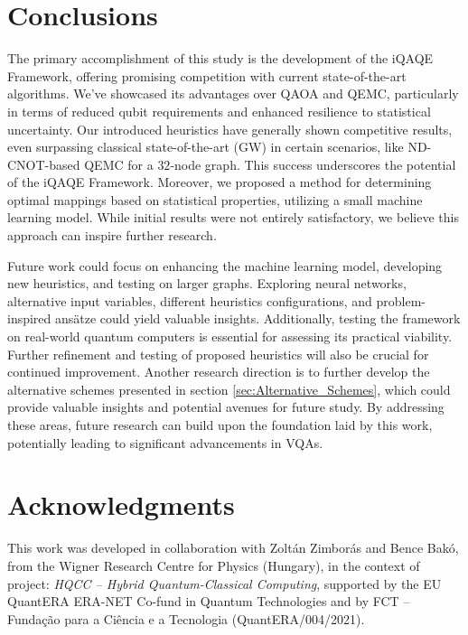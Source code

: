 \section{Conclusions}
\label{sec:Conclusions}
The primary accomplishment of this study is the development of the iQAQE Framework, offering promising competition with current state-of-the-art algorithms. We've showcased its advantages over QAOA and QEMC, particularly in terms of reduced qubit requirements and enhanced resilience to statistical uncertainty. Our introduced heuristics have generally shown competitive results, even surpassing classical state-of-the-art (GW) in certain scenarios, like ND-CNOT-based QEMC for a $32$-node graph. This success underscores the potential of the iQAQE Framework. Moreover, we proposed a method for determining optimal mappings based on statistical properties, utilizing a small machine learning model. While initial results were not entirely satisfactory, we believe this approach can inspire further research.

Future work could focus on enhancing the machine learning model, developing new heuristics, and testing on larger graphs. Exploring neural networks, alternative input variables, different heuristics configurations, and problem-inspired ansätze could yield valuable insights. Additionally, testing the framework on real-world quantum computers is essential for assessing its practical viability. Further refinement and testing of proposed heuristics will also be crucial for continued improvement. Another research direction is to further develop the alternative schemes presented in section \ref{sec:Alternative_Schemes}, which could provide valuable insights and potential avenues for future study. By addressing these areas, future research can build upon the foundation laid by this work, potentially leading to significant advancements in VQAs.


\section*{Acknowledgments}
\label{sec:Acknowledgments}
This work was developed in collaboration with Zoltán Zimborás and Bence Bakó, from the Wigner Research Centre for Physics (Hungary), in the context of project: \textit{HQCC – Hybrid Quantum-Classical Computing}, supported by the EU QuantERA ERA-NET Co-fund in Quantum Technologies and by FCT -- Funda\c{c}\~{a}o para a Ci\^{e}ncia e a Tecnologia (QuantERA/004/2021).

